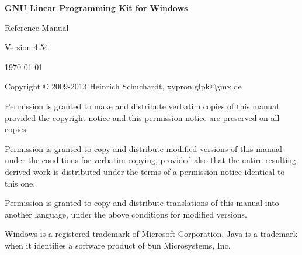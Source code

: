 \documentclass[a4paper,11pt]{report}
\begin{document}
\thispagestyle{empty}

\begin{center}

\vspace*{1in}

\begin{huge}
\sf\bfseries GNU Linear Programming Kit\linebreak
for Windows
\end{huge}

\vspace{0.5in}

\begin{LARGE}
\sf Reference Manual
\end{LARGE}

\vspace{0.5in}

\begin{LARGE}
\sf Version 4.54
\end{LARGE}

\vspace{0.5in}
\begin{Large}
\sf \today
\end{Large}
\end{center}

\newpage

\vspace*{1in}

\vfill

\medskip \noindent
Copyright \copyright{} 2009-2013 Heinrich Schuchardt, xypron.glpk@gmx.de

\medskip \noindent
Permission is granted to make and distribute verbatim copies of this
manual provided the copyright notice and this permission notice are
preserved on all copies.

\medskip \noindent
Permission is granted to copy and distribute modified versions of this
manual under the conditions for verbatim copying, provided also that the
entire resulting derived work is distributed under the terms of
a permission notice identical to this one.

\medskip \noindent
Permission is granted to copy and distribute translations of this manual
into another language, under the above conditions for modified versions.

\medskip \noindent
Windows is a registered trademark of Microsoft Corporation. Java is a 
trademark when it identifies a software product of Sun Microsystems, Inc.

\tableofcontents
\end{document}
